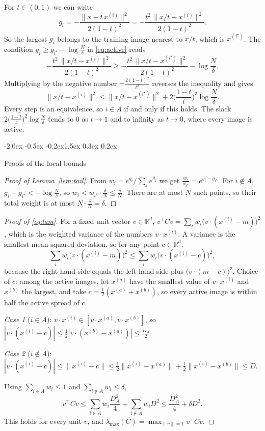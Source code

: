 \documentclass{article}
\makeatletter
\renewcommand{\section}{\@startsection{section}{1}{\z@}%
  {-2.0ex \@plus -0.5ex \@minus -0.2ex}{1.5ex \@plus 0.3ex \@minus 0.2ex}{\large\bfseries\raggedright}}
\theoremstyle{remark}
\newcommand{\R}{\mathbb{R}}
\newcommand{\xn}[1]{x^{(#1)}}
\newcommand{\lmax}{\lambda_{\max}}
\makeatother
\begin{document}
For $t \in (0,1)$ we can write
$$
  g_i = -\frac{\|x - t\,\xn{i}\|^2}{2(1 - t)^2} = -\frac{t^2\,\|x/t - \xn{i}\|^2}{2(1 - t)^2}.
$$
So the largest $g_i$ belongs to the training image nearest to $x/t$, which is $\xn{i^\star}$. The condition $g_i \ge g_{i^\star} - \log\frac N\delta$ in \eqref{eq:active} reads
$$
  -\frac{t^2\,\|x/t - \xn{i}\|^2}{2(1 - t)^2} \ge -\frac{t^2\,\|x/t - \xn{i^\star}\|^2}{2(1 - t)^2} - \log\frac N\delta .
$$
Multiplying by the negative number $-\frac{2(1 - t)^2}{t^2}$ reverses the inequality and gives
$$
  \|x/t - \xn{i}\|^2 \le \|x/t - \xn{i^\star}\|^2 + 2\Big(\frac{1 - t}{t}\Big)^2\log\frac N\delta .
$$
Every step is an equivalence, so $i \in A$ if and only if this holds. The slack $2\big(\frac{1 - t}{t}\big)^2\log\frac N\delta$ tends to $0$ as $t \to 1$ and to infinity as $t \to 0$, where every image is active.

\section{Proofs of the local bounds}\label{app:bounds}

\begin{proof}[Proof of Lemma~\ref{lem:tail}]
From $w_i = e^{g_i}/\sum_je^{g_j}$ we get $\frac{w_i}{w_{i^\star}} = e^{g_i - g_{i^\star}}$. For $i \notin A$, $g_i - g_{i^\star} < -\log\frac N\delta$, so $w_i < w_{i^\star} \cdot \frac\delta N \le \frac\delta N$. There are at most $N$ such points, so their total weight is at most $N \cdot \frac\delta N = \delta$.
\end{proof}

\begin{proof}[Proof of \eqref{eq:lam}]
For a fixed unit vector $v \in \R^d$, $v^\top Cv = \sum_iw_i\big(v \cdot (\xn{i} - m)\big)^2$, which is the weighted variance of the numbers $v \cdot \xn{i}$. A variance is the smallest mean squared deviation, so for any point $c \in \R^d$,
\[
  \sum_iw_i\big(v \cdot (\xn{i} - m)\big)^2 \le \sum_iw_i\big(v \cdot (\xn{i} - c)\big)^2,
\]
because the right-hand side equals the left-hand side plus $\big(v \cdot (m - c)\big)^2$. Choice of $c$: among the active images, let $\xn{a}$ have the smallest value of $v \cdot \xn{i}$ and $\xn{b}$ the largest, and take $c = \frac12(\xn{a} + \xn{b})$, so every active image is within half the active spread of $c$.

\emph{Case 1} ($i \in A$): $v \cdot \xn{i} \in [v \cdot \xn{a},v \cdot \xn{b}]$, so $|v \cdot (\xn{i} - c)| \le \frac12|v \cdot (\xn{b} - \xn{a})| \le \frac{D_A}{2}$.

\emph{Case 2} ($i \notin A$): $|v \cdot (\xn{i} - c)| \le \|\xn{i} - c\| \le \frac12\|\xn{i} - \xn{a}\| + \frac12\|\xn{i} - \xn{b}\| \le D$.

Using $\sum_{i \in A}w_i \le 1$ and $\sum_{i \notin A}w_i \le \delta$,
\[
  v^\top Cv \le \sum_{i \in A}w_i\frac{D_A^2}{4} + \sum_{i \notin A}w_iD^2 \le \frac{D_A^2}{4} + \delta D^2 .
\]
This holds for every unit $v$, and $\lmax(C) = \max_{\|v\| = 1}v^\top Cv$.
\end{proof}
\end{document}
